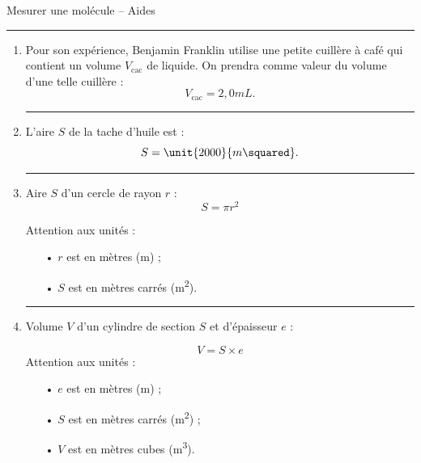 \documentclass[12pt,a4paper]{article}
\begin{document}
\begin{header}
Mesurer une molécule -- Aides
\end{header}

\hrule{}
\vspace{5pt}
\begin{enumerate}
\item Pour son expérience, Benjamin Franklin utilise une petite cuillère à café qui contient un volume $V_\mathrm{cac}$ de liquide.
On prendra comme valeur du volume d'une telle cuillère :
\[
V_\mathrm{cac} = \unit{2{,}0}{mL}.
\]

\hrule{}
\vspace{5pt}
\item
L'aire $S$ de la tache d'huile est :
\[
S = \unit{2000}{m\squared}.
\]

\hrule{}
\vspace{5pt}
\item 
\begin{multicols}{2}
Aire $S$ d'un cercle de rayon $r$ :
\[
S = \pi r^2
\]

Attention aux unités :
\begin{itemize}
\item[•] $r$ est en mètres (m) ;
\item[•] $S$ est en mètres carrés (m\textsuperscript{2}).
\end{itemize}
\hfill

\begin{center}
\end{center}
\end{multicols}

\hrule{}
\vspace{5pt}
\item Volume $V$ d'un cylindre de section $S$ et d'épaisseur $e$ :
\begin{multicols}{2}
\[
V = S \times e
\]
Attention aux unités :
\begin{itemize}
\item[•] $e$ est en mètres (m) ;
\item[•] $S$ est en mètres carrés (m\textsuperscript{2}) ;
\item[•] $V$ est en mètres cubes (m\textsuperscript{3}).
\end{itemize}
\hfill

\hfill
\begin{center}
\end{center}
\end{multicols}


\end{enumerate}
\end{document}

